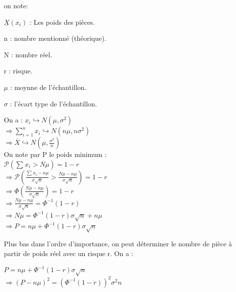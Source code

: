 \documentclass[12pt, a4paper]{thesis}
\begin{document}
on note:
\item $ \underline{X}( x_{i})$ : Les poids des pièces.
\item n : nombre mentionné (théorique).
\item N : nombre réel.
\item r : risque.
\item $\mu$ : moynne de l'échantillon.
\item  $\sigma$ : l'écart type de l'échantillon.
 
 
On a : $x_{i} \hookrightarrow N(\mu , \sigma^{2}) $\\

$\Longrightarrow \sum_{i=1}^{n} x_{i} \hookrightarrow N(n\mu , n\sigma^{2}) $ \\

$\Longrightarrow \overline{X} \hookrightarrow N(\mu , \frac{\sigma^{2}}{n}) $\\

On note par P le poids minimum  : \\
$\mathcal P ({ \sum_{}^{} x_{i} > N \mu}) = 1- r$\\

$\Longrightarrow \mathcal P ({ \frac{\sum_{}^{} x_{i} - n\mu}{\sigma \sqrt{n}} >\frac{N \mu - n \mu}{\sigma \sqrt{n}}}) =1- r  $\\

$\Longrightarrow  \Phi( \frac{N \mu - n \mu}{\sigma \sqrt{n}} )= 1 - r   $\\

$\Longrightarrow \frac{N \mu - n \mu}{\sigma \sqrt{n}} = \Phi^{-1}(1-r)$\\

$\Longrightarrow N \mu = \Phi^{-1}(1-r) \sigma \sqrt{n} + n \mu $\\

$\Longrightarrow P =  n \mu + \Phi^{-1}(1-r) \sigma \sqrt{n} $

    

Plus bas dans l'ordre d'importance, on peut déterminer le nombre de pièce à partir de poids réel avec un risque r. On a : 

$ P =  n \mu + \Phi^{-1}(1-r) \sigma \sqrt{n} $\\

$\Longrightarrow (P - n \mu)^2 =  (\Phi^{-1}(1-r))^{2} \sigma^{2} n $\\
\end{document}
